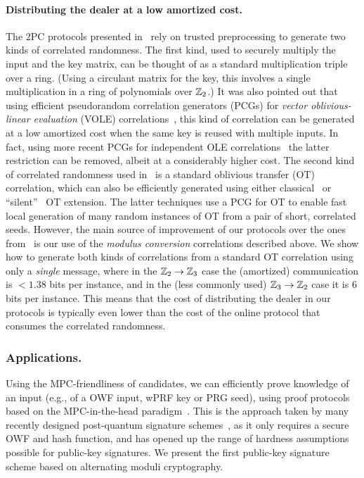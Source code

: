 \paragraph{Distributing the dealer at a low amortized cost.} The 2PC protocols presented in~\cite{boneh2018-darkmatter} rely on trusted preprocessing to generate two kinds of correlated randomness. The first kind, used to securely multiply the input and the key matrix, can be thought of as a standard multiplication triple over a ring. (Using a circulant matrix for the key, this involves a single multiplication in a ring of polynomials over $\mathbb{Z}_2$.)  It was also pointed out that using efficient pseudorandom correlation generators (PCGs) for {\em vector oblivious-linear evaluation} (VOLE) correlations~\cite{BCGI18,BoyleetalCCS19,SchopmanetalCCS19}, this kind of correlation can be generated at a low amortized cost when the same key is reused with multiple inputs. In fact, using more recent PCGs for independent OLE correlations~\cite{PCGRingLPNCrypto20} the latter restriction can be removed, albeit at a considerably higher cost.  The second kind of correlated randomness used in~\cite{boneh2018-darkmatter} is a standard oblivious transfer (OT) correlation, which can also be efficiently generated using either classical~\cite{IKNP} or ``silent''~\cite{PCGCrypto19,BoyleetalCCS19,Ferret} OT extension. The latter techniques use a PCG for OT to enable fast local generation of many random instances of OT from a pair of short, correlated seeds.  
However, the main source of improvement of our protocols over the ones from~\cite{boneh2018-darkmatter}  is our use of the {\em modulus conversion} correlations described above. We show how to generate both kinds of correlations from a standard OT correlation using only a {\em single} message, where in the $\mathbb{Z}_2 \to \mathbb{Z}_3$ case the (amortized) communication is $<1.38$ bits per instance, and in the (less commonly used) $\mathbb{Z}_3 \to \mathbb{Z}_2$ case it is $6$ bits per instance. This means that the cost of distributing the dealer in our protocols is typically even lower than the cost of the online protocol that consumes the correlated randomness.


\subsubsection{Applications.}

Using the MPC-friendliness of candidates, we can efficiently prove knowledge of
an input (e.g., of a OWF input, wPRF key or PRG seed), using proof protocols
based on the MPC-in-the-head paradigm~\cite{STOC:IKOS07}.  This is the approach
taken by many recently designed post-quantum signature
schemes~\cite{CCS:CDGORR17,CCS:KatKolWan18,EC:Beullens20,PQCRYPTO:BeudeS20,SAC:dDOS19,banquet},
as it only requires a secure OWF and hash function, and has opened up the range
of hardness assumptions possible for public-key signatures.  We present the
first public-key signature scheme based on alternating moduli cryptography. 

